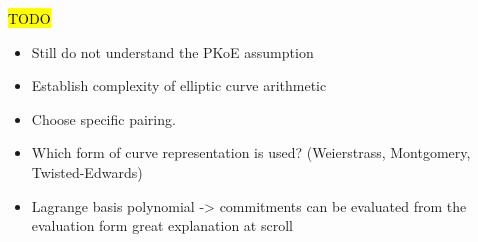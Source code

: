 \documentclass[12pt, a4paper]{report}
\theoremstyle{plain}
\theoremstyle{plain}
\theoremstyle{remark}
\begin{document}







\hl{TODO}
\begin{itemize}
    \item Still do not understand the PKoE assumption
    \item Establish complexity of elliptic curve arithmetic
    \item Choose specific pairing.
    \item Which form of curve representation is used? (Weierstrass, Montgomery, Twisted-Edwards)
    \item Lagrange basis polynomial -> commitments can be evaluated from the evaluation form great explanation at scroll
\end{itemize}



\listoffigures

\listoftables



\end{document}
